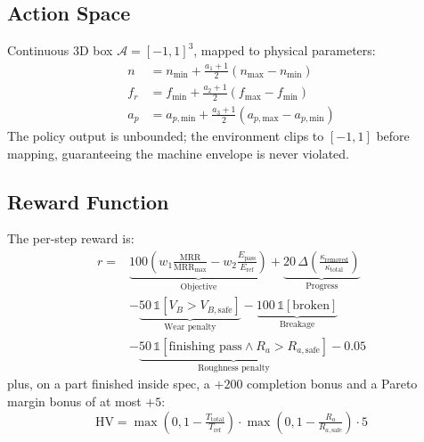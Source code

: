 \documentclass[11pt,a4paper]{article}
\newcommand{\MRR}{\mathrm{MRR}}
\newcommand{\Ra}{R_a}
\newcommand{\RaSafe}{R_{a,\text{safe}}}
\newcommand{\VBSafe}{V_{B,\text{safe}}}
\newcommand{\VB}{V_B}
\begin{document}
\subsection{Action Space}
Continuous 3D box $\mathcal{A} = [-1, 1]^3$, mapped to physical parameters:
\begin{align}
    n &= n_\text{min} + \frac{a_1+1}{2}(n_\text{max}-n_\text{min}) \\
    f_r &= f_\text{min} + \frac{a_2+1}{2}(f_\text{max}-f_\text{min}) \\
    a_p &= a_{p,\text{min}} + \frac{a_3+1}{2}(a_{p,\text{max}}-a_{p,\text{min}})
\end{align}
The policy output is unbounded; the environment clips to $[-1,1]$ before mapping, guaranteeing the machine envelope is never violated.

\subsection{Reward Function}
The per-step reward is:
\begin{equation}
\begin{split}
r ={}& \underbrace{100\left(w_1 \frac{\MRR}{\MRR_\text{max}} - w_2 \frac{E_\text{pass}}{E_\text{ref}}\right)}_{\text{Objective}}
+ \underbrace{20\,\Delta\!\left(\tfrac{\kappa_\text{removed}}{\kappa_\text{total}}\right)}_{\text{Progress}} \\
& - \underbrace{50\,\mathbb{1}[\VB > \VBSafe]}_{\text{Wear penalty}}
- \underbrace{100\,\mathbb{1}[\text{broken}]}_{\text{Breakage}} \\
& - \underbrace{50\,\mathbb{1}[\text{finishing pass} \wedge \Ra > \RaSafe]}_{\text{Roughness penalty}}
- 0.05
\end{split}
\end{equation}
plus, on a part finished inside spec, a $+200$ completion bonus and a Pareto margin bonus of at most $+5$:
\begin{equation}
    \text{HV} = \max\!\left(0, 1 - \tfrac{T_\text{total}}{T_\text{ref}}\right) \cdot \max\!\left(0, 1 - \tfrac{\Ra}{\RaSafe}\right) \cdot 5
\end{equation}
\end{document}
